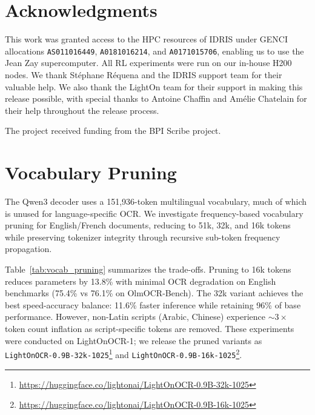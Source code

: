 \documentclass{article}
\begin{document}
\section*{Acknowledgments}

This work was granted access to the HPC resources of IDRIS under GENCI allocations \texttt{AS011016449}, \texttt{A0181016214}, and \texttt{A0171015706}, enabling us to use the Jean Zay supercomputer. All RL experiments were run on our in-house H200 nodes. We thank Stéphane Réquena and the IDRIS support team for their valuable help. We also thank the LightOn team for their support in making this release possible, with special thanks to Antoine Chaffin and Amélie Chatelain for their help throughout the release process.

The project received funding from the BPI Scribe project.



\newpage
\appendix
\section{Vocabulary Pruning}
\label{sec:vocab_pruning}

The Qwen3 decoder uses a 151,936-token multilingual vocabulary, much of which is unused for language-specific OCR. We investigate frequency-based vocabulary pruning for English/French documents, reducing to 51k, 32k, and 16k tokens while preserving tokenizer integrity through recursive sub-token frequency propagation.

Table~\ref{tab:vocab_pruning} summarizes the trade-offs. Pruning to 16k tokens reduces parameters by 13.8\% with minimal OCR degradation on English benchmarks (75.4\% vs 76.1\% on OlmOCR-Bench). The 32k variant achieves the best speed-accuracy balance: 11.6\% faster inference while retaining 96\% of base performance. However, non-Latin scripts (Arabic, Chinese) experience ${\sim}3\times$ token count inflation as script-specific tokens are removed. These experiments were conducted on LightOnOCR-1; we release the pruned variants as \texttt{LightOnOCR-0.9B-32k-1025}\footnote{\url{https://huggingface.co/lightonai/LightOnOCR-0.9B-32k-1025}} and \texttt{LightOnOCR-0.9B-16k-1025}\footnote{\url{https://huggingface.co/lightonai/LightOnOCR-0.9B-16k-1025}}.
\end{document}
